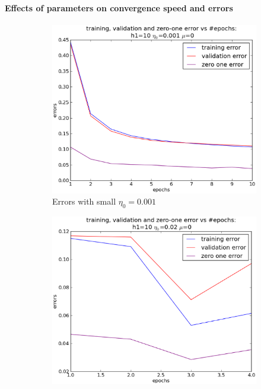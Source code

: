 \paragraph{Effects of parameters on convergence speed and errors}
\begin{itemize}
		\begin{figure}[!ht]
		\centering
		\begin{subfigure}[b]{.45\textwidth}
		\centering
		\includegraphics[width=\textwidth]{mlp/plots/effects/very_small_eta.eps}
		\caption{Errors with small $\eta_0=0.001$}
		\label{fig:small_eta}
		\end{subfigure}
		\quad
		\begin{subfigure}[b]{.45\textwidth}
		\centering
		\includegraphics[width=\textwidth]{mlp/plots/effects/larger_eta.eps}

\end{subfigure}
\end{figure}
\end{itemize}
